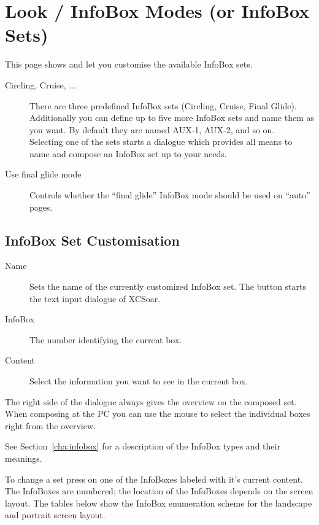 \section{Look / InfoBox Modes (or InfoBox Sets)}\label{sec:infobox_sets}
\label{conf:infobox_sets}

This page shows and let you customise the available InfoBox sets.

\begin{description}
\item[Circling, Cruise, ...]  There are three predefined InfoBox sets (Circling, Cruise, Final Glide). 
  Additionally you can define up to five more InfoBox sets and name them as you want.   
  By default they are named AUX-1, AUX-2, and so on. \\
  Selecting one of the sets starts a dialogue which provides all means to name and 
  compose an InfoBox set up to your needs.

\item[Use final glide mode]  Controls whether the ``final glide'' InfoBox mode should be used on ``auto'' pages.
\end{description}

\subsection*{InfoBox Set Customisation}

\begin{description}
\item[Name]  Sets the name of the currently customized InfoBox set. The 
  button starts the text input dialogue of XCSoar.
\item[InfoBox]  The number identifying the current box.
\item[Content]  Select the information you want to see in the current box.
\end{description}

The right side of the dialogue always gives the overview on the composed set. 
When composing at the PC you can use the mouse to select the individual boxes 
right from the overview.


See Section~\ref{cha:infobox} for a description of the InfoBox types and their meanings.

To change a set press on one of the InfoBoxes labeled with it's current content.
The InfoBoxes are numbered; the location of the InfoBoxes depends on the screen layout.  
The tables below show the InfoBox enumeration scheme for the
landscape and portrait screen layout.

